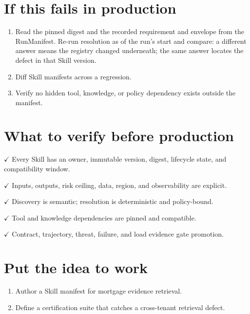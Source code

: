 \section{If this fails in production}

\begin{enumerate}

\item Read the pinned digest and the recorded requirement and envelope from the RunManifest. Re-run resolution as of the run's start and compare: a different answer means the registry changed underneath; the same answer locates the defect in that Skill version.

\item Diff Skill manifests across a regression.

\item Verify no hidden tool, knowledge, or policy dependency exists outside the manifest.

\end{enumerate}

\section{What to verify before production}

\textbf{\ensuremath{\checkmark}} Every Skill has an owner, immutable version, digest, lifecycle state, and compatibility window.\par

\textbf{\ensuremath{\checkmark}} Inputs, outputs, risk ceiling, data, region, and observability are explicit.\par

\textbf{\ensuremath{\checkmark}} Discovery is semantic; resolution is deterministic and policy-bound.\par

\textbf{\ensuremath{\checkmark}} Tool and knowledge dependencies are pinned and compatible.\par

\textbf{\ensuremath{\checkmark}} Contract, trajectory, threat, failure, and load evidence gate promotion.\par

\section{Put the idea to work}

\begin{enumerate}

\item Author a Skill manifest for mortgage evidence retrieval.

\item Define a certification suite that catches a cross-tenant retrieval defect.

\end{enumerate}

